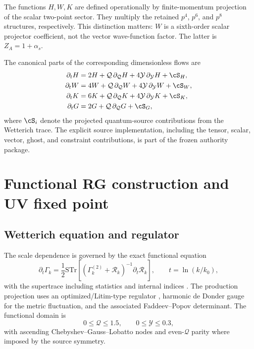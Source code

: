 \documentclass[12pt]{iopart}
\newcommand{\STr}{\mathrm{STr}}
\newcommand{\cR}{\mathcal R}
\newcommand{\Q}{\mathcal Q}
\newcommand{\Y}{\mathcal Y}
\begin{document}
The functions $H,W,K$ are defined operationally by finite-momentum projection of the scalar two-point sector.  They multiply the retained $p^4$, $p^6$, and $p^8$ structures, respectively.  This distinction matters: $W$ is a sixth-order scalar projector coefficient, not the vector wave-function factor.  The latter is $Z_A=1+\alpha_s$.

The canonical parts of the corresponding dimensionless flows are
\begin{align}
\partial_t H &=2H+\Q\,\partial_\Q H+4\Y\,\partial_\Y H+\cS_H,\\
\partial_t W &=4W+\Q\,\partial_\Q W+4\Y\,\partial_\Y W+\cS_W,\\
\partial_t K &=6K+\Q\,\partial_\Q K+4\Y\,\partial_\Y K+\cS_K,\\
\partial_t G &=2G+\Q\,\partial_\Q G+\cS_G,
\label{eq:canonicalflows}
\end{align}
where $\cS_i$ denote the projected quantum-source contributions from the Wetterich trace.  The explicit source implementation, including the tensor, scalar, vector, ghost, and constraint contributions, is part of the frozen authority package.

\section{Functional RG construction and UV fixed point}
\label{sec:frg}

\subsection{Wetterich equation and regulator}

The scale dependence is governed by the exact functional equation
\begin{equation}
\partial_t\Gamma_k=\frac12\STr\left[
\left(\Gamma_k^{(2)}+\cR_k\right)^{-1}\partial_t\cR_k
\right],\qquad t=\ln(k/k_0),
\label{eq:wetterich}
\end{equation}
with the supertrace including statistics and internal indices \cite{Wetterich1993,Reuter1998,Saueressig2023}.  The production projection uses an optimized/Litim-type regulator \cite{Litim2001}, harmonic de Donder gauge for the metric fluctuation, and the associated Faddeev--Popov determinant.  The functional domain is
\begin{equation}
0\le \Q\le1.5,\qquad 0\le\Y\le0.3,
\end{equation}
with ascending Chebyshev--Gauss--Lobatto nodes and even-$\Q$ parity where imposed by the source symmetry.
\end{document}
